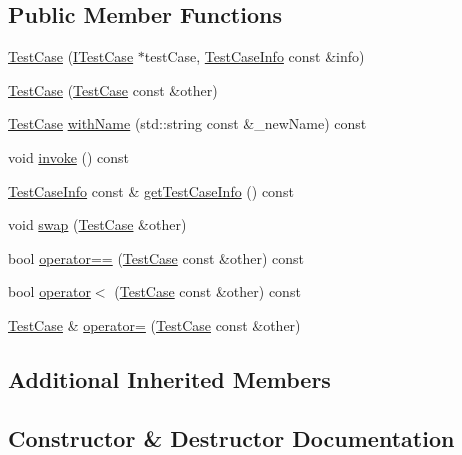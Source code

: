 \subsection*{Public Member Functions}
\begin{DoxyCompactItemize}
\item 
\hyperlink{class_catch_1_1_test_case_a03a5b913484681bd6d398dc5e9c2a907}{Test\+Case} (\hyperlink{struct_catch_1_1_i_test_case}{I\+Test\+Case} $\ast$test\+Case, \hyperlink{struct_catch_1_1_test_case_info}{Test\+Case\+Info} const \&info)
\item 
\hyperlink{class_catch_1_1_test_case_ac0011d3789edc3e44edb41f13c4775a0}{Test\+Case} (\hyperlink{class_catch_1_1_test_case}{Test\+Case} const \&other)
\item 
\hyperlink{class_catch_1_1_test_case}{Test\+Case} \hyperlink{class_catch_1_1_test_case_a0812e8a216d09b087d5874687009f0d6}{with\+Name} (std\+::string const \&\+\_\+new\+Name) const
\item 
void \hyperlink{class_catch_1_1_test_case_a26f346c8446dded0562fe3818ae71651}{invoke} () const
\item 
\hyperlink{struct_catch_1_1_test_case_info}{Test\+Case\+Info} const  \& \hyperlink{class_catch_1_1_test_case_a1ea0d79f49156cebea076fe1ba50d2b6}{get\+Test\+Case\+Info} () const
\item 
void \hyperlink{class_catch_1_1_test_case_aee38f908faf10b905b209ca388275413}{swap} (\hyperlink{class_catch_1_1_test_case}{Test\+Case} \&other)
\item 
bool \hyperlink{class_catch_1_1_test_case_a5456d03a90f75292835c158f3a3374a1}{operator==} (\hyperlink{class_catch_1_1_test_case}{Test\+Case} const \&other) const
\item 
bool \hyperlink{class_catch_1_1_test_case_a030e4b9282e9b32e08c8bd5e5cd6fa98}{operator$<$} (\hyperlink{class_catch_1_1_test_case}{Test\+Case} const \&other) const
\item 
\hyperlink{class_catch_1_1_test_case}{Test\+Case} \& \hyperlink{class_catch_1_1_test_case_a8022e3f74232f7887d2d2cbbc8876502}{operator=} (\hyperlink{class_catch_1_1_test_case}{Test\+Case} const \&other)
\end{DoxyCompactItemize}
\subsection*{Additional Inherited Members}


\subsection{Constructor \& Destructor Documentation}
\hypertarget{class_catch_1_1_test_case_a03a5b913484681bd6d398dc5e9c2a907}{}\label{class_catch_1_1_test_case_a03a5b913484681bd6d398dc5e9c2a907} 
